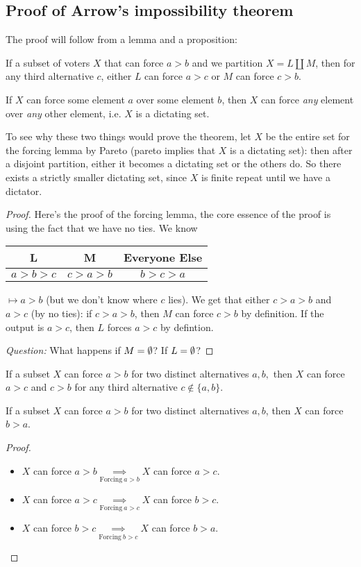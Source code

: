 \subsection{Proof of Arrow's impossibility theorem}
The proof will follow from a lemma and a proposition:
\begin{lemma}\label{forcing}
   If a subset of voters $X$ that can force $a>b$ and we partition $X=L\amalg M$, then for any third alternative $c$, either $L$ can force $a>c$ or $M$ can force $c>b$. 
\end{lemma}
\begin{prop}\label{prop}
    If $X$ can force some element $a$ over some element $b$, then $X$ can force \emph{any} element over \emph{any} other element, i.e. $X$ is a dictating set.
\end{prop}
To see why these two things would prove the theorem, let $X$ be the entire set for the forcing lemma by Pareto (pareto implies that $X$ is a dictating set): then after a disjoint partition, either it becomes a dictating set or the others do. So there exists a strictly smaller dictating set, since $X$ is finite repeat until we have a dictator. 
\begin{proof}
  Here's the proof of the forcing lemma, the core essence of the proof is using the fact that we have no ties. We know \begin{tabular}{c|c|c}
      L& M & Everyone Else\\
        \hline
      $a>b>c$ & $c>a>b$ & $b>c>a$
  \end{tabular} $\mapsto a>b$ (but we don't know where $c$ lies). We get that either $c>a>b$ and $a>c$ (by no ties): if $c>a>b $, then $M$ can force $c>b$ by definition. If the output is $a>c$, then $L$ forces $a>c$ by defintion.

    \item \emph{Question:} What happens if $M=\emptyset$? If $L=\emptyset$?
\end{proof}
\begin{cor}\label{new}
   If a subset $X$ can force $a>b$ for two distinct alternatives $a,b,$ then $X$ can force $a>c$ and $c>b$ for any third alternative $c\notin \{a,b\} $. 
\end{cor}
\begin{cor}\label{swap}
    If a subset $X$ can force $a>b$ for two distinct alternatives $a,b$, then $X$ can force $b>a$.
\end{cor}
\begin{proof}
    \,
    \begin{itemize}
        \item $X$ can force $a>b \underset{\text{Forcing} \ a>b}{\implies } X$ can force $a>c$.
        \item $X$ can force $a>c \underset{\text{Forcing} \ a>c}{\implies } X$ can force $b>c$.
        \item $X$ can force $b>c \underset{\text{Forcing} \ b>c}{\implies } X$ can force $b>a$.
    \end{itemize}
\end{proof}
